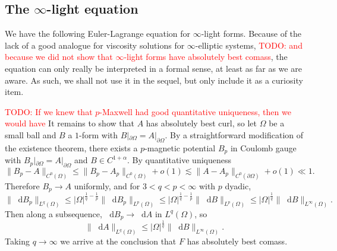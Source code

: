 \documentclass[reqno,11pt]{amsart}
\newcommand*\dif{\mathop{}\!\mathrm{d}}
\theoremstyle{definition}
\numberwithin{equation}{section}
\newcommand\todo[1]{\textcolor{red}{TODO: #1}}
\begin{document}
\subsection{The \texorpdfstring{$\infty$-light equation}{infinity-light equation}}
We have the following Euler-Lagrange equation for $\infty$-light forms.
Because of the lack of a good analogue for viscosity solutions for $\infty$-elliptic systems, \todo{and because we did not show that $\infty$-light forms have absolutely best comass}, the equation can only really be interpreted in a formal sense, at least as far as we are aware.
As such, we shall not use it in the sequel, but only include it as a curiosity item.


\todo{If we knew that $p$-Maxwell had good quantitative uniqueness, then we would have}
It remains to show that $A$ has absolutely best curl, so let $\Omega$ be a small ball and $B$ a $1$-form with $B|_{\partial \Omega} = A|_{\partial \Omega}$.
By a straightforward modification of the existence theorem, there exists a $p$-magnetic potential $B_p$ in Coulomb gauge with $B_p|_{\partial \Omega} = A|_{\partial \Omega}$ and $B \in C^{1 + \alpha}$.
By quantitative uniqueness
$$\|B_p - A\|_{C^0(\Omega)} \leq \|B_p - A_p\|_{C^0(\Omega)} + o(1) \lesssim \|A - A_p\|_{C^0(\partial \Omega)} + o(1) \ll 1.$$
Therefore $B_p \to A$ uniformly, and for $3 < q < p < \infty$ with $p$ dyadic,
$$\|\dif B_p\|_{L^q(\Omega)} \leq |\Omega|^{\frac{1}{q} -\frac{1}{p}} \|\dif B_p\|_{L^p(\Omega)} \leq |\Omega|^{\frac{1}{q} -\frac{1}{p}} \|\dif B\|_{L^p(\Omega)} \leq |\Omega|^{\frac{1}{q}} \|\dif B\|_{L^\infty(\Omega)}.$$
Then along a subsequence, $\dif B_p \to \dif A$ in $L^q(\Omega)$, so 
$$\|\dif A\|_{L^q(\Omega)} \leq |\Omega|^{\frac{1}{q}} \|\dif B\|_{L^\infty(\Omega)}.$$
Taking $q \to \infty$ we arrive at the conclusion that $F$ has absolutely best comass.
\end{document}
